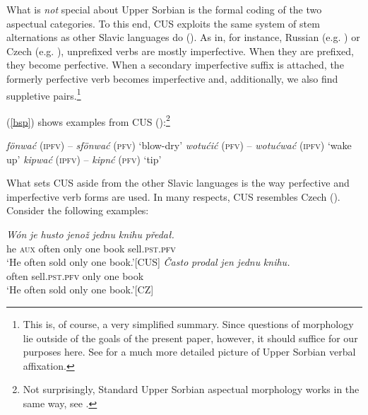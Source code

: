 \documentclass[output=paper,colorlinks,citecolor=brown]{langscibook}
\begin{document}
What is \textit{not} special about Upper Sorbian 
is the formal coding of the two aspectual categories. 
To this end, CUS exploits the same system of stem alternations as other 
Slavic languages do (\citealt[248]{Breu2012}). 
As in, for instance, Russian  (e.g. \citealt{AG1980}) or Czech (e.g. \citealt{Karlik95}), 
unprefixed verbs are mostly imperfective. When they are prefixed, they
become perfective. When a secondary imperfective suffix is attached, the formerly perfective verb becomes imperfective and, additionally, we also find suppletive pairs.\footnote{This is, of course, a very simplified summary. Since questions of morphology lie outside of the goals of the present paper, however, it should suffice for our purposes here. See \citet{Werner2003} for a much more detailed picture of Upper Sorbian verbal affixation.}  

(\ref{bsp}) shows examples from CUS (\citealt[230]{Scholze2008}):\footnote{Not surprisingly, Standard Upper Sorbian aspectual morphology works in the same way, see \citet[230]{Scholze2008}.} 

 \ea\label{bsp}
\ea \textit{f\"onwa\'c} (\textsc{ipfv}) -- \textit{sf\"onwa\'c} (\textsc{pfv}) `blow-dry'
\ex \textit{wotu\'ci\'c} (\textsc{pfv}) -- \textit{wotu\'cwa\'c} (\textsc{ipfv}) `wake up'
\ex \textit{kipwa\'c} (\textsc{ipfv}) -- \textit{kipn\'c} (\textsc{pfv}) `tip' 
\z 
\z


\noindent What sets CUS aside from the other Slavic languages is the way perfective and imperfective verb forms are used. In many respects, CUS resembles Czech (\citealt[45]{Breu2000}). Consider the following examples:

 \ea\label{uspl}
\gll \textit{W\'on}
\textit{je} \textit{husto} \textit{jenož}
\textit{jednu} \textit{knihu} \textit{předa\l.}\\
he \textsc{aux} often only one book sell.\textsc{pst.\textcolor{black}{pfv}} \\
\glt \normalsize{`He often sold only one book.'}\hfill \small{[CUS]}
\z 
 \ea\label{czpl}
\gll \textit{\v{C}asto}
\textit{prodal} \textit{jen}
\textit{jednu} \textit{knihu.} \\
often sell.\textsc{pst.\textcolor{black}{pfv}} only one book \\
\glt \normalsize{`He often sold only one book.'}\hfill \small{[CZ]}
\z 
\end{document}
